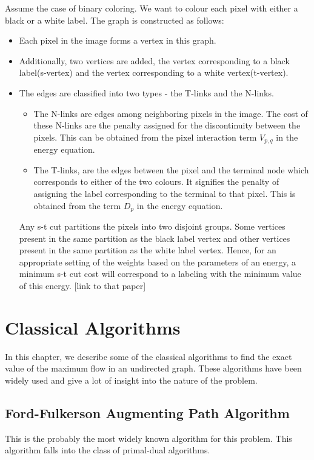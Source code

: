 \documentclass[BTech]{iitmdiss}
\begin{document}
	  Assume the case of binary coloring. We want to colour each pixel with either a black or a white label. The graph is constructed as follows:
	  \begin{itemize}
	   \item
	    Each pixel in the image forms a vertex in this graph.
	   \item
	    Additionally, two vertices are added, the vertex corresponding to a black label(s-vertex) and the vertex corresponding to a 
	    white vertex(t-vertex).
	   
	   \item 
	    The edges are classified into two types - the T-links and the N-links.
	    \begin{itemize}
	     \item 
		The N-links are edges among neighboring pixels in the image.
	    The cost of these N-links are the penalty assigned for the discontinuity between the pixels. This can be obtained from the pixel interaction
	    term $V_{p,q}$ in the energy equation.
	    \item
		The T-links, are the edges between the pixel and the terminal node which corresponds to either of
	    the two colours. It signifies the penalty of assigning the label corresponding to the terminal to that pixel. This is obtained from
	    the term $D_p$ in the energy equation.
	    \end{itemize}
	    
	    Any s-t cut partitions the pixels into two disjoint groups. Some vertices present in the same partition as the black label vertex
	    and other vertices present in the same partition as the white label vertex. Hence, for an appropriate setting of the weights based
	    on the parameters of an energy, a minimum s-t cut cost will correspond to a labeling with the minimum value of this energy. [link to
	    that paper]
	    
	    
	  \end{itemize}


	 \chapter{Classical Algorithms}
	  In this chapter, we describe some of the classical algorithms to find the exact value of the maximum flow in an undirected graph. These
	  algorithms have been widely used and give a lot of insight into the nature of the problem. 
	  
	  \section{Ford-Fulkerson Augmenting Path Algorithm}
	    This is the probably the most widely known algorithm for this problem. This algorithm falls into the class of primal-dual algorithms.
	    
\end{document}
